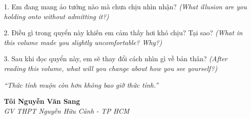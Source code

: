 \begin{tuhocnhanh}
1. Em đang mang ảo tưởng nào mà chưa chịu nhìn nhận? \textit{(What illusion are you holding onto without admitting it?)}

2. Điều gì trong quyển này khiến em cảm thấy hơi khó chịu? Tại sao? \textit{(What in this volume made you slightly uncomfortable? Why?)}

3. Sau khi đọc quyển này, em sẽ thay đổi cách nhìn gì về bản thân? \textit{(After reading this volume, what will you change about how you see yourself?)}
\end{tuhocnhanh}

\begin{center}
\textit{\color{truyengold}``Thức tỉnh muộn còn hơn không bao giờ thức tỉnh.''}
\end{center}

\begin{flushright}
\textbf{Tôi Nguyễn Văn Sang}\\
\textit{GV THPT Nguyễn Hữu Cảnh - TP HCM}
\end{flushright}

\ngancach
